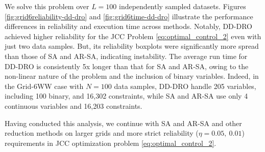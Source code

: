 We solve this problem over $L=100$ independently sampled datasets. Figures \ref{fig:grid6reliability-dd-dro} and \ref{fig:grid6time-dd-dro} illustrate the performance differences in reliability and execution time across methods. Notably, DD-DRO achieved higher reliability for the JCC Problem \ref{eq:optimal_control_2} even with just two data samples. But, its reliability boxplots were significantly more spread than those of SA and AR-SA, indicating instability. The average run time for DD-DRO is consistently 5x longer than that for SA and AR-SA, owing to the non-linear nature of the problem and the inclusion of binary variables. Indeed, in the Grid-6WW case with $N=100$ data samples, DD-DRO handle 205 variables, including 100 binary, and 16,302 constraints, while SA and AR-SA use only 4 continuous variables and 16,203 constraints.

%
%
Having conducted this analysis, we continue with SA and AR-SA and other reduction methods on larger grids and more strict reliability ($\eta = 0.05, ~0.01$) requirements in JCC optimization problem \eqref{eq:optimal_control_2}.
\vspace{-1mm}
